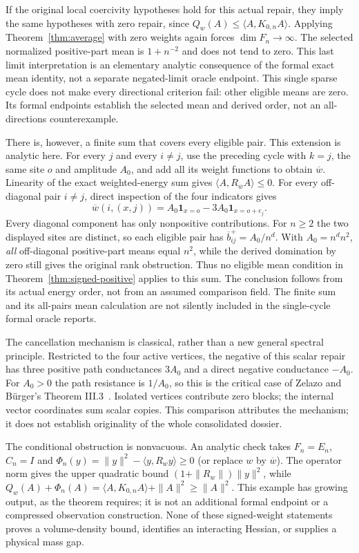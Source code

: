 \documentclass[11pt]{article}
\newcommand{\ip}[2]{\langle #1,#2\rangle}
\begin{document}
If the original local coercivity hypotheses hold for this actual repair,
they imply the same hypotheses with zero repair, since $Q_w(A)\leq
\ip{A}{K_{0,n}A}$. Applying Theorem~\ref{thm:average} with zero weights
again forces $\dim F_n\to\infty$. The selected normalized positive-part mean is
$1+n^{-2}$ and does not tend to zero. This last limit interpretation is
an elementary analytic consequence of the formal exact mean identity,
not a separate negated-limit oracle endpoint. This single sparse cycle
does not make every directional criterion fail: other eligible means
are zero. Its formal endpoints establish the selected mean and derived
order, not an all-directions counterexample.

There is, however, a finite sum that covers every eligible pair. This
extension is analytic here. For every $j$ and every $i\ne j$, use the
preceding cycle with $k=j$, the same site $o$ and amplitude $A_0$, and add
all its weight functions to obtain $\overline w$. Linearity of the exact
weighted-energy sum gives $\ip{A}{R_{\overline w}A}\leq0$.
For every off-diagonal pair $i\ne j$, direct inspection of the four
indicators gives
\[
 \overline w(i,(x,j))=
 A_0\mathbf1_{x=o}-3A_0\mathbf1_{x=o+e_j}.
\]
Every diagonal component has only nonpositive contributions. For $n\geq2$
the two displayed sites are distinct, so each eligible pair has
$\overline b^+_{ij}=A_0/n^d$. With $A_0=n^d n^2$, \emph{all} off-diagonal
positive-part means equal $n^2$, while the derived domination by zero
still gives the original rank obstruction. Thus no eligible mean condition
in Theorem~\ref{thm:signed-positive} applies to this sum. The conclusion
follows from its actual energy order, not from an assumed comparison
field. The finite sum and its all-pairs mean calculation are not silently
included in the single-cycle formal oracle reports.

The cancellation mechanism is classical, rather than a new general
spectral principle. Restricted to the four active vertices, the negative
of this scalar repair has three positive path conductances $3A_0$ and a
direct negative conductance $-A_0$. For $A_0>0$ the path resistance is
$1/A_0$, so this is the critical case of Zelazo and B\"urger's
Theorem III.3~\cite{zelazo}. Isolated vertices contribute zero blocks;
the internal vector coordinates sum scalar copies. This comparison
attributes the mechanism; it does not establish originality of the
whole consolidated dossier.

The conditional obstruction is nonvacuous. An analytic check takes
$F_n=E_n$, $C_n=I$ and
$\Phi_n(y)=\|y\|^2-\ip{y}{R_w y}\geq0$ (or replace $w$ by $\overline w$).
The operator norm gives the upper quadratic bound
$(1+\|R_w\|)\|y\|^2$, while $Q_w(A)+\Phi_n(A)
=\ip{A}{K_{0,n}A}+\|A\|^2\geq\|A\|^2$.
This example has growing output, as the theorem requires; it is not an
additional formal endpoint or a compressed observation construction.
None of these signed-weight statements proves a volume-density bound,
identifies an interacting Hessian, or supplies a physical mass gap.
\end{document}
